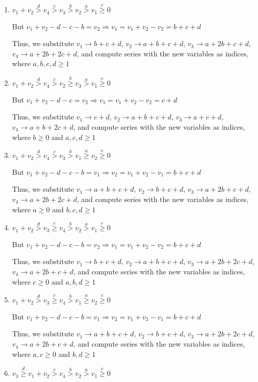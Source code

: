 \documentclass{article}
\begin{document}
\begin{enumerate}
\item 
$v_1+v_2\overset{d}{>}v_4\overset{c}{>}v_3\overset{b}{>}{v_2}\overset{a}{>}v_1\overset{e}{\geq}{0}$

But $v_1+v_2-d-c-b=v_2\Rightarrow{v_1=v_1+v_2-v_2=b+c+d}$

Thus, we substitute 
$v_1\rightarrow{b+c+d}$, $v_2\rightarrow{a+b+c+d}$, $v_3\rightarrow{a+2b+c+d}$, $v_4\rightarrow{a+2b+2c+d}$, and compute series with the new variables as indices, where $a,b,c,d\geq{1}$

\item 
$v_1+v_2\overset{d}{>}v_4\overset{c}{>}v_2\overset{b}{\geq}{v_3}\overset{a}{>}v_1\overset{e}{\geq}{0}$

But $v_1+v_2-d-c=v_2\Rightarrow{v_1=v_1+v_2-v_2=c+d}$

Thus, we substitute 
$v_1\rightarrow{c+d}$, $v_2\rightarrow{a+b+c+d}$, $v_3\rightarrow{a+c+d}$, $v_4\rightarrow{a+b+2c+d}$, and compute series with the new variables as indices, where $b\geq{0}$ and $a,c,d\geq{1}$

\item 
$v_1+v_2\overset{d}{>}v_4\overset{c}{>}v_3\overset{b}{>}{v_1}\overset{a}{\geq}v_2\overset{e}{\geq}{0}$

But $v_1+v_2-d-c-b=v_1\Rightarrow{v_2=v_1+v_2-v_1=b+c+d}$

Thus, we substitute 
$v_1\rightarrow{a+b+c+d}$, $v_2\rightarrow{b+c+d}$, $v_3\rightarrow{a+2b+c+d}$, $v_4\rightarrow{a+2b+2c+d}$, and compute series with the new variables as indices, where $a\geq{0}$ and $b,c,d\geq{1}$

\item 
$v_1+v_2\overset{d}{>}v_3\overset{c}{\geq}v_4\overset{b}{>}{v_2}\overset{a}{>}v_1\overset{e}{\geq}{0}$

But $v_1+v_2-d-c-b=v_2\Rightarrow{v_1=v_1+v_2-v_2=b+c+d}$

Thus, we substitute 
$v_1\rightarrow{b+c+d}$, $v_2\rightarrow{a+b+c+d}$, $v_3\rightarrow{a+2b+2c+d}$, $v_4\rightarrow{a+2b+c+d}$, and compute series with the new variables as indices, where $c\geq{0}$ and $a,b,d\geq{1}$
\item 
$v_1+v_2\overset{d}{>}v_3\overset{c}{\geq}v_4\overset{b}{>}{v_1}\overset{a}{\geq}v_2\overset{e}{\geq}{0}$

But $v_1+v_2-d-c-b=v_1\Rightarrow{v_2=v_1+v_2-v_1=b+c+d}$

Thus, we substitute 
$v_1\rightarrow{a+b+c+d}$, $v_2\rightarrow{b+c+d}$, $v_3\rightarrow{a+2b+2c+d}$, $v_4\rightarrow{a+2b+c+d}$, and compute series with the new variables as indices, where $a,c\geq{0}$ and $b,d\geq{1}$
\item 
$v_3\overset{d}{\geq}v_1+v_2\overset{c}{>}v_4\overset{b}{>}{v_2}\overset{a}{>}v_1\overset{e}{\geq}{0}$


\end{enumerate}
\end{document}

